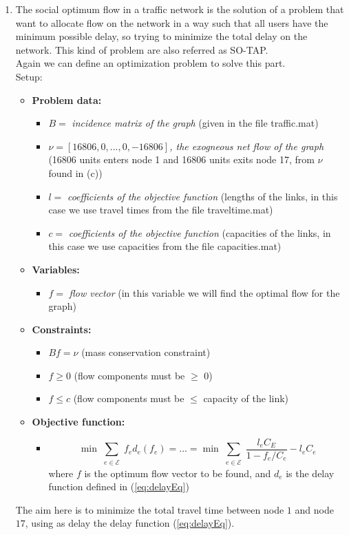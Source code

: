 \documentclass[
	12pt, %
]{fphw}
\begin{document}
\begin{enumerate}[{\bfseries (a)}]
    \item The social optimum flow in a traffic network is the solution of a problem that want to allocate flow on the network in a way such that all users have the minimum possible delay, so trying to minimize the total delay on the network. This kind of problem are also referred as SO-TAP.\\
    Again we can define an optimization problem to solve this part.\\
    Setup:
    \begin{itemize}
        \item \textbf{Problem data:} 
        \begin{itemize}
            \item $B =$ \emph{incidence matrix of the graph }(given in the file traffic.mat)
            \item $\nu = [16806, 0, ..., 0, -16806]$\emph{, the exogneous net flow of the graph} (16806 units enters node 1 and 16806 units exits node 17, from $\nu$ found in (c))
            \item $l =$ \emph{coefficients of the objective function} (lengths of the links, in this case we use travel times from the file traveltime.mat)
            \item $c =$ \emph{coefficients of the objective function} (capacities of the links, in this case we use capacities from the file capacities.mat)
        \end{itemize}
        \item \textbf{Variables:}
        \begin{itemize}
            \item $f =$ \emph{flow vector} (in this variable we will find the optimal flow for the graph)
        \end{itemize}
        \item \textbf{Constraints:}
        \begin{itemize}
            \item $Bf = \nu$ (mass conservation constraint)
            \item $f \geq 0$ (flow components must be $\geq$ 0)
            \item $f \leq c$ (flow components must be $\leq$ capacity of the link)
        \end{itemize}
        \item \textbf{Objective function:}
        \begin{itemize}
            \item $$\min \sum_{\substack{e \in \mathcal{E}}}f_e d_e(f_e) = ... = \min \sum_{\substack{e \in \mathcal{E}}}\frac{l_eC_E}{1-f_e/C_e}-l_eC_e$$ 
            where $f$ is the optimum flow vector to be found, and $d_e$ is the delay function defined in (\ref{eq:delayEq})
        \end{itemize}
    \end{itemize}
    The aim here is to minimize the total travel time between node $1$ and node $17$, using as delay the delay function (\ref{eq:delayEq}).
    

\end{enumerate}
\end{document}

